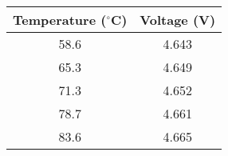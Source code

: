 \begin{tabular}{|c|c|} 
        \hline
        \textbf{Temperature ($^{\circ}$C)} & \textbf{Voltage (V)} \\
        \hline
        58.6 & 4.643\\
        \hline
	65.3 & 4.649\\ 
	\hline
	71.3 & 4.652\\
	\hline
	78.7 & 4.661\\
	\hline
	83.6 & 4.665\\
	\hline
    \end{tabular}
